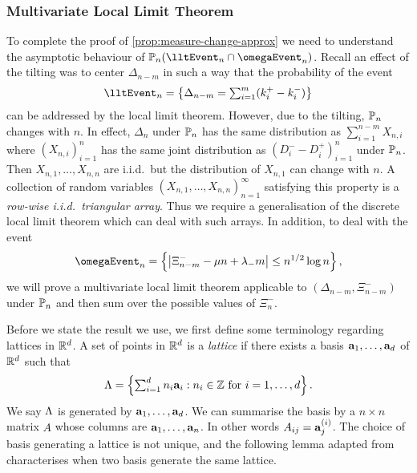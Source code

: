 \subsubsection{Multivariate Local Limit Theorem}

To complete the proof of \cref{prop:measure-change-approx} we need to understand the asymptotic behaviour of $\P_n(\lltEvent_n \cap \omegaEvent_n)$. Recall an effect of the tilting was to center $\Delta_{n-m}$ in such a way that the probability of the event
\begin{equation*}
    \lltEvent_n = \left\{ 
        \Delta_{n-m} = \textstyle \sum_{i=1}^m (k_i^+ - k_i^-)
    \right\}
\end{equation*}
can be addressed by the local limit theorem. However, due to the tilting, $\P_n$ changes with $n$. In effect, $\Delta_n$ under $\P_n$ has the same distribution as $\sum_{i=1}^{n-m} X_{n, i}$ where $(X_{n, i})_{i=1}^n$ has the same joint distribution as $(D_i^- - D_i^+)_{i=1}^n$ under $\P_n$. Then $X_{n, 1}, \ldots, X_{n, n}$ are i.i.d.\ but the distribution of $X_{n, 1}$ can change with $n$. A collection of random variables $(X_{n, 1}, \ldots, X_{n, n})_{n = 1}^{\infty}$ satisfying this property is a \emph{row-wise i.i.d.\ triangular array}. Thus we require a generalisation of the discrete local limit theorem which can deal with such arrays. In addition, to deal with the event
\begin{equation*}
    \omegaEvent_n = \left\{ 
        \abs*{\Xi_{n-m}^- - \mu n + \lambda_- m} \leq n^{1/2} \log n
    \right\},
\end{equation*}
we will prove a multivariate local limit theorem applicable to $(\Delta_{n-m}, \Xi^-_{n-m})$ under $\P_n$ and then sum over the possible values of $\Xi^-_n$.

Before we state the result we use, we first define some terminology regarding lattices in $\R^d$. A set of points in $\R^d$ is a \emph{lattice} if there exists a basis $\va_1, \ldots, \va_d$ of $\R^d$ such that
\begin{equation*}
    \lattice = \left\{ 
        \textstyle \sum_{i=1}^d n_i \va_i : n_i \in \Z \text{ for $i = 1, \ldots, d$}
    \right\}.
\end{equation*}
We say $\lattice$ is generated by $\va_1, \ldots, \va_d$. We can summarise the basis by a $n \times n$ matrix $A$ whose columns are $\va_1, \ldots, \va_n$. In other words $A_{ij} = \va_j^{(i)}$. The choice of basis generating a lattice is not unique, and the following lemma adapted from \cite[Corollary 4.3a]{schrijverTheoryLinearInteger1998} characterises when two basis generate the same lattice.

